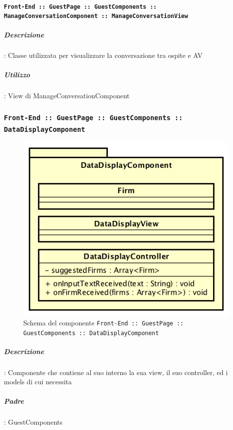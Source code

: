 \documentclass[../DefinizioneDiProdotto_v2.0.0.tex]{subfiles}
\begin{document}
			\paragraph{\texttt{Front-End :: GuestPage :: GuestComponents :: ManageConversationComponent :: ManageConversationView}}

				\subparagraph{Descrizione}: Classe utilizzata per visualizzare la conversazione tra ospite e AV
				\subparagraph{Utilizzo}: View di ManageConversationComponent



	\newpage
	\subsubsection{\texttt{Front-End :: GuestPage :: GuestComponents :: DataDisplayComponent}}
	\begin{figure}[!h]
		\centering
		\includegraphics[scale=0.7]{Architettura/Front-End/GuestPage/GuestComponents/DataDisplayComponent.png}
		\caption{Schema del componente \texttt{Front-End :: GuestPage :: GuestComponents :: DataDisplayComponent}}
	\end{figure}

			\subparagraph{Descrizione}: Componente che contiene al suo interno la sua view, il suo controller, ed i models di cui necessita
			\subparagraph{Padre}: GuestComponents
\end{document}
